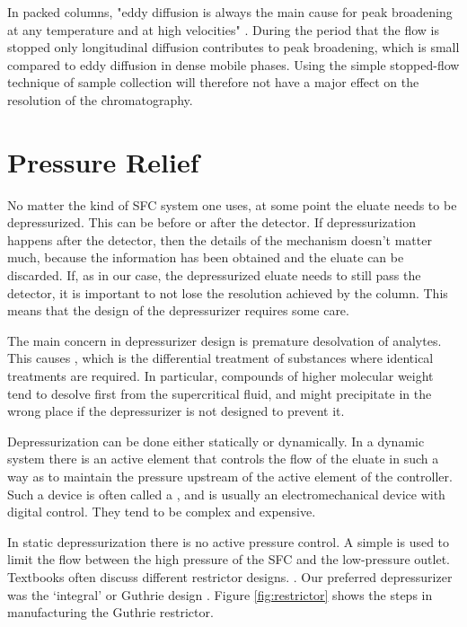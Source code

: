In packed columns, "eddy diffusion is always the main cause for peak broadening
at any temperature and at high velocities" \autocite{Gritti2006}. During the
period that the flow is stopped only longitudinal diffusion contributes to peak
broadening, which is small compared to eddy diffusion in dense mobile phases.
Using the simple stopped-flow technique of sample collection will therefore not
have a major effect on the resolution of the \oneD chromatography.


\section{Pressure Relief}
\label{sec:Restrictor}

No matter the kind of SFC system one uses, at some point the eluate needs to be
depressurized. This can be before or after the detector. If depressurization
happens after the detector, then the details of the mechanism doesn't matter
much, because the information has been obtained and the eluate can be discarded.
If, as in our case, the depressurized eluate needs to still pass the detector,
it is important to not lose the resolution achieved by the column.
This means that the design of the depressurizer requires some care.

The main concern in depressurizer design is premature desolvation of analytes.
This causes , which is the differential treatment of
substances where identical treatments are required. In particular, compounds of
higher molecular weight tend to desolve first from the supercritical fluid, and
might precipitate in the wrong place if the depressurizer is not designed to
prevent it. 

Depressurization can be done either statically or dynamically. In a dynamic
system there is an active element that controls the flow of the eluate in such a
way as to maintain the pressure upstream of the active element of the
controller. Such a device is often called a ,
and is usually an electromechanical device with digital control. They tend to
be complex and expensive.

In static depressurization there is no active pressure control. A simple
 is used to limit the flow between the high pressure of the
SFC and the low-pressure outlet. Textbooks often discuss different restrictor
designs. \autocite[The book by][provides an example.]{LuquedeCastro1994}. Our
preferred depressurizer was the `integral' or Guthrie design
\autocite{Guthrie1986}. Figure \ref{fig:restrictor} shows the steps in
manufacturing the Guthrie restrictor.

